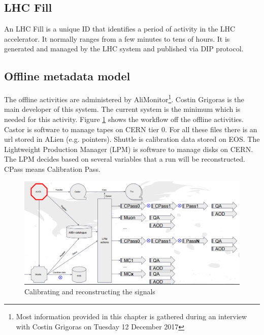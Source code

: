\subsection{LHC Fill}
An LHC Fill is a unique ID that identifies a period of activity in the LHC accelerator. It normally ranges from a few minutes to tens of hours. It is generated and managed by the LHC system and published via DIP protocol. 

\subsection{Offline metadata model}
The offline activities are administered by AliMonitor\footnote{Most information provided in this chapter is gathered during an interview with Costin Grigoras on Tuesday 12 December 2017}. Costin Grigoras is the main developer of this system. The current system is the minimum which is needed for this activity. Figure \ref{fig:offlineWorkflow} shows the workflow off the offline activities. Castor is software to manage tapes on CERN tier 0. For all these files there is an url stored in ALien (e.g. pointers). Shuttle is calibration data stored on EOS. The Lightweight Production Manager (LPM) is software to manage disks on CERN. The LPM decides based on several variables that a run will be reconstructed. CPass means Calibration Pass. 

\begin{figure}
  \begin{center}
    \includegraphics[scale=0.25]{./images/offline_workflow.png}
    \caption{Calibrating and reconstructing the signals}
    \label{fig:offlineWorkflow}
  \end{center}
\end{figure}

